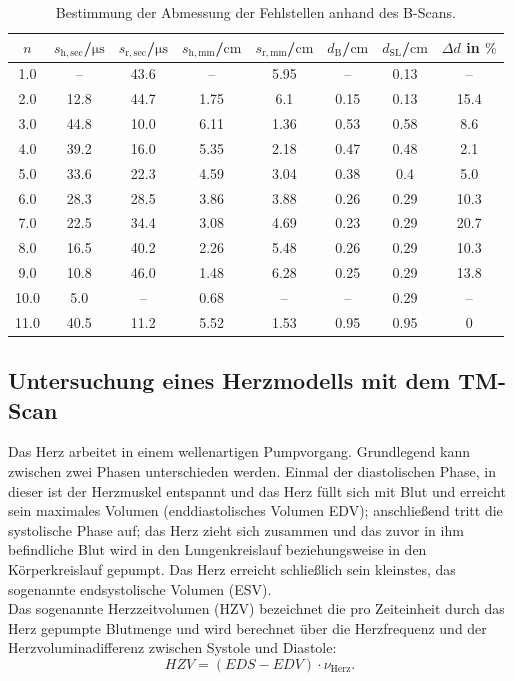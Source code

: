 \begin{table}
  \centering
  \caption{Bestimmung der Abmessung der Fehlstellen anhand des B-Scans.}
  \label{tab:bscan}
\begin{tabular}{cccccccc}
\toprule
$n$ & $s_\mathrm{h,sec}$/$\si{\micro\second}$ &$s_\mathrm{r,sec}$/$\si{\micro\second}$  & $s_\mathrm{h,mm}$/$\si{\centi\meter}$  & $s_\mathrm{r,mm}$/$\si{\centi\meter}$& $d_\mathrm{B}$/$\si{\centi\meter}$& $d_\mathrm{SL}$/$\si{\centi\meter}$ & $\Delta d$ in $ \%$ \\
\midrule
1.0 & -- & 43.6 & -- & 5.95 & -- & 0.13 & -- \\
2.0 & 12.8 & 44.7 & 1.75 & 6.1 & 0.15 & 0.13 & 15.4 \\
3.0 & 44.8 & 10.0 & 6.11 & 1.36 & 0.53 & 0.58 & 8.6 \\
4.0 & 39.2 & 16.0 & 5.35 & 2.18 & 0.47 & 0.48 & 2.1 \\
5.0 & 33.6 & 22.3 & 4.59 & 3.04 & 0.38 & 0.4 & 5.0 \\
6.0 & 28.3 & 28.5 & 3.86 & 3.88 & 0.26 & 0.29 & 10.3 \\
7.0 & 22.5 & 34.4 & 3.08 & 4.69 & 0.23 & 0.29 & 20.7 \\
8.0 & 16.5 & 40.2 & 2.26 & 5.48 & 0.26 & 0.29 & 10.3 \\
9.0 & 10.8 & 46.0 & 1.48 & 6.28 & 0.25 & 0.29 & 13.8 \\
10.0 & 5.0 & -- & 0.68 & -- & -- & 0.29 & -- \\
11.0 & 40.5 & 11.2 & 5.52 & 1.53 & 0.95 & 0.95 & 0 \\
\bottomrule
\end{tabular}
\end{table}
\FloatBarrier
\subsection{Untersuchung eines Herzmodells mit dem TM-Scan}
Das Herz arbeitet in einem wellenartigen Pumpvorgang. Grundlegend kann zwischen zwei Phasen unterschieden werden. Einmal der diastolischen Phase, in dieser ist der Herzmuskel entspannt und das Herz füllt sich mit Blut und erreicht sein maximales Volumen (enddiastolisches Volumen EDV); anschließend tritt die systolische Phase auf; das Herz zieht sich zusammen und das zuvor in ihm befindliche Blut wird in den Lungenkreislauf beziehungsweise in den Körperkreislauf gepumpt. Das Herz erreicht schließlich sein kleinstes, das sogenannte endsystolische Volumen (ESV).\\
Das sogenannte Herzzeitvolumen (HZV) bezeichnet die pro Zeiteinheit durch das Herz gepumpte Blutmenge und wird berechnet über die Herzfrequenz  und der Herzvoluminadifferenz zwischen Systole und Diastole:
\begin{equation}
  HZV=\left(EDS-EDV\right)\cdot \nu_\mathrm{Herz} \text{.}
\end{equation}

